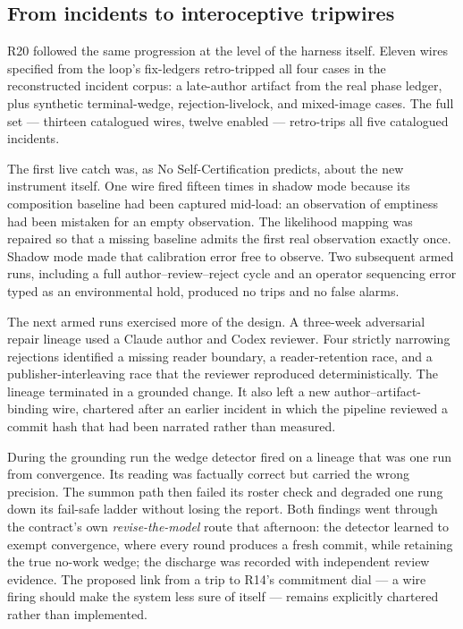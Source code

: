 \subsection{From incidents to interoceptive tripwires}

R20 followed the same progression at the level of the harness itself.  Eleven
wires specified from the loop's fix-ledgers retro-tripped all four cases in
the reconstructed incident corpus: a late-author artifact from the real phase
ledger, plus synthetic terminal-wedge, rejection-livelock, and mixed-image
cases.  The full set --- thirteen catalogued wires, twelve enabled ---
retro-trips all five catalogued incidents.

The first live catch was, as No Self-Certification predicts, about the new
instrument itself.  One wire fired fifteen times in shadow mode because its
composition baseline had been captured mid-load: an observation of emptiness
had been mistaken for an empty observation.  The likelihood mapping was
repaired so that a missing baseline admits the first real observation exactly
once.  Shadow mode made that calibration error free to observe.  Two subsequent
armed runs, including a full author--review--reject cycle and an operator
sequencing error typed as an environmental hold, produced no trips and no false
alarms.

The next armed runs exercised more of the design.  A three-week adversarial
repair lineage used a Claude author and Codex reviewer.  Four strictly narrowing
rejections identified a missing reader boundary, a reader-retention race, and a
publisher-interleaving race that the reviewer reproduced deterministically.
The lineage terminated in a grounded change.  It also left a new
author--artifact-binding wire, chartered after an earlier incident in which the
pipeline reviewed a commit hash that had been narrated rather than measured.

During the grounding run the wedge detector fired on a lineage that was one run
from convergence.  Its reading was factually correct but carried the wrong
precision.  The summon path then failed its roster check and degraded one rung
down its fail-safe ladder without losing the report.  Both findings went through
the contract's own \emph{revise-the-model} route that afternoon: the detector
learned to exempt convergence, where every round produces a fresh commit, while
retaining the true no-work wedge; the discharge was recorded with independent
review evidence.  The proposed link from a trip to R14's commitment dial --- a
wire firing should make the system less sure of itself --- remains explicitly
chartered rather than implemented.

